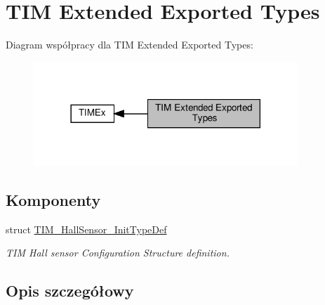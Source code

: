 \hypertarget{group___t_i_m_ex___exported___types}{}\section{T\+IM Extended Exported Types}
\label{group___t_i_m_ex___exported___types}
Diagram współpracy dla T\+IM Extended Exported Types\+:\nopagebreak
\begin{figure}[H]
\begin{center}
\leavevmode
\includegraphics[width=282pt]{group___t_i_m_ex___exported___types}
\end{center}
\end{figure}
\subsection*{Komponenty}
\begin{DoxyCompactItemize}
\item 
struct \hyperlink{struct_t_i_m___hall_sensor___init_type_def}{T\+I\+M\+\_\+\+Hall\+Sensor\+\_\+\+Init\+Type\+Def}
\begin{DoxyCompactList}\small\item\em T\+IM Hall sensor Configuration Structure definition. \end{DoxyCompactList}\end{DoxyCompactItemize}


\subsection{Opis szczegółowy}
